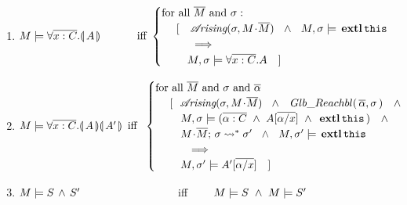 {{\begin{definition}
\begin{enumerate}
\item
$
\satisfies{M}{ \OneStateQ {\overline {x:C}} {A} } \  \ \ \ \ \ \ \ \ \  \mbox{iff}  \     
    \begin{cases}
     \mbox{for all }   \Mtwo  \mbox{ and }  \sigma:\\
   \ \ \ \  [\ \ \   \arising{\sigma}{M\madd\Mtwo}  \ \  \wedge\ \ M, \sigma  \models {\external{\prg{this}}} \\
    \ \ \ \ \ \   \ \ \ \Longrightarrow\\
    \ \ \ \ \ \  \  \satisfiesA{M}{\sigma}{\forall \overline{x:C}.A}\ \  \  ] 
    \end{cases} 
 $
 \item
 $\satisfies{M}{\TwoStatesQ {\overline {x:C}} {A}{A'}}   \ \,  \mbox{iff}  \   \
    \begin{cases}
     \mbox{for all }   \Mtwo  \mbox{ and }  \sigma  \mbox{ and }  \overline{\alpha}    \\
 \ \ \ \  [ \ \ { \arising{\sigma}{M\madd \Mtwo }\   \  \wedge\ \ \GRelevant {\overline \alpha}  \sigma}\ \ \ \wedge  \\
  \ \ \ \  \ \ \  \satisfiesA {M}   {\sigma}  {(\overline {\alpha :C} \ \wedge\  {A[\overline{\alpha/x}]}\ \wedge \  {\external{\prg{this}}}) } \ \ \ \wedge   \\
 \ \ \ \   \ \ \ {\leadstoBoundedStar {M\madd \Mtwo}{\sigma}  {\sigma'} } \ \ \wedge\ \  M, \sigma' \models {\external{\prg{this}}}  \\
 \ \ \ \   \ \ \ \ \  \ \Longrightarrow   \\
 \ \ \ \   \ \ \  {\satisfiesA{M}{\sigma'}{ A'[\overline{\alpha/x}]}  }  \ \ \  ]  
     \end{cases} 
 $
 \item
 $M \models S\, \wedge\, S'$  \ \ \ \ \ \ \ \ \ \ \ \ \ \ \ \ \    iff  \  \ \  \   $\satisfies{M}{S}\ \wedge \ \satisfies{M}{S'}$
\end{enumerate}



\end{definition}}}
